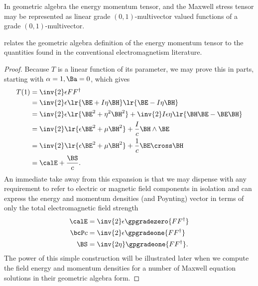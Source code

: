 
In geometric algebra the energy momentum tensor, and the Maxwell stress tensor may be represented as linear grade \((0,1)\)-multivector valued functions of a grade \((0,1)\)-multivector.
\index{\(\BT(\Ba)\)}




 relates the geometric algebra definition of the energy momentum tensor to the quantities found in the conventional
electromagnetism literature.
\begin{proof}
Because \( T \) is a linear function of its parameter, we may prove this in parts, starting with \( \alpha = 1, \Ba = 0 \), which gives
\begin{equation}\label{eqn:poyntingF:80}
\begin{aligned}
T(1)
&= \inv{2} \epsilon F F^\dagger \\
&= \inv{2} \epsilon \lr{ \BE + I \eta \BH } \lr{ \BE - I \eta \BH } \\
&= \inv{2} \epsilon \lr{ \BE^2 + \eta^2 \BH^2 } + \inv{2} I \epsilon \eta \lr{ \BH \BE - \BE \BH } \\
&= \inv{2} \lr{ \epsilon \BE^2 + \mu \BH^2 } + \frac{I}{c} \BH \wedge \BE \\
&= \inv{2} \lr{ \epsilon \BE^2 + \mu \BH^2 }
+ \frac{1}{c} \BE \cross \BH \\
&= \calE + \frac{\BS}{c}.
\end{aligned}
\end{equation}
An immediate take away from this expansion is that we
may dispense with any requirement to refer to electric or magnetic field components in isolation and can express the energy and momentum densities (and Poynting) vector in terms of only the total electromagnetic field strength
\begin{equation}\label{eqn:poyntingF:40}
\begin{aligned}
\calE &= \inv{2} \epsilon \gpgradezero{ F F^\dagger } \\
\bcP c &= \inv{2} \epsilon \gpgradeone{ F F^\dagger } \\
\BS &= \inv{2 \eta} \gpgradeone{ F F^\dagger }.
\end{aligned}
\end{equation}
The power of this simple construction will be illustrated later when we compute the field energy and momentum densities for a number of Maxwell equation solutions in their geometric algebra form.


\end{proof}
